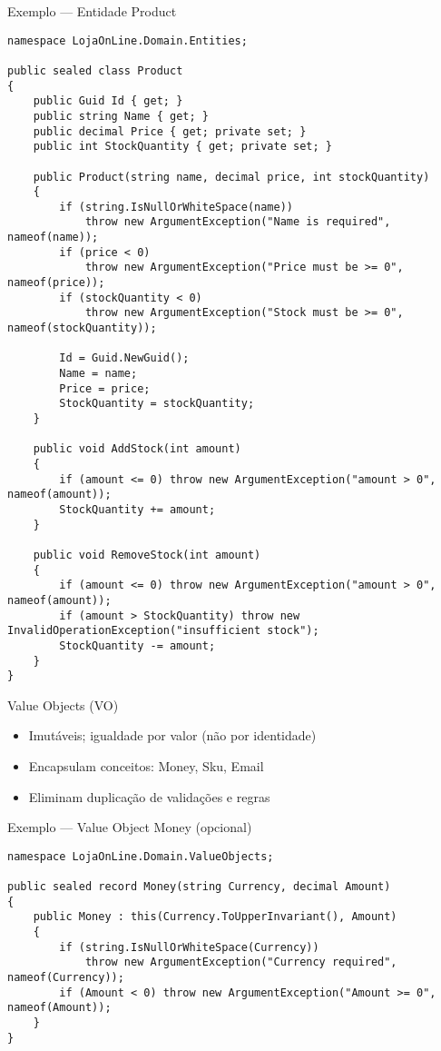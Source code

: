 \documentclass{beamer}
\begin{document}
\begin{frame}[fragile]{Exemplo — Entidade Product}
\begin{lstlisting}
namespace LojaOnLine.Domain.Entities;

public sealed class Product
{
    public Guid Id { get; }
    public string Name { get; }
    public decimal Price { get; private set; }
    public int StockQuantity { get; private set; }

    public Product(string name, decimal price, int stockQuantity)
    {
        if (string.IsNullOrWhiteSpace(name))
            throw new ArgumentException("Name is required", nameof(name));
        if (price < 0)
            throw new ArgumentException("Price must be >= 0", nameof(price));
        if (stockQuantity < 0)
            throw new ArgumentException("Stock must be >= 0", nameof(stockQuantity));

        Id = Guid.NewGuid();
        Name = name;
        Price = price;
        StockQuantity = stockQuantity;
    }

    public void AddStock(int amount)
    {
        if (amount <= 0) throw new ArgumentException("amount > 0", nameof(amount));
        StockQuantity += amount;
    }

    public void RemoveStock(int amount)
    {
        if (amount <= 0) throw new ArgumentException("amount > 0", nameof(amount));
        if (amount > StockQuantity) throw new InvalidOperationException("insufficient stock");
        StockQuantity -= amount;
    }
}
\end{lstlisting}
\end{frame}

\begin{frame}{Value Objects (VO)}
\begin{itemize}
  \item Imutáveis; igualdade por valor (não por identidade)
  \item Encapsulam conceitos: Money, Sku, Email
  \item Eliminam duplicação de validações e regras
\end{itemize}
\end{frame}

\begin{frame}[fragile]{Exemplo — Value Object Money (opcional)}
\begin{lstlisting}
namespace LojaOnLine.Domain.ValueObjects;

public sealed record Money(string Currency, decimal Amount)
{
    public Money : this(Currency.ToUpperInvariant(), Amount)
    {
        if (string.IsNullOrWhiteSpace(Currency))
            throw new ArgumentException("Currency required", nameof(Currency));
        if (Amount < 0) throw new ArgumentException("Amount >= 0", nameof(Amount));
    }
}
\end{lstlisting}
\end{frame}
\end{document}
